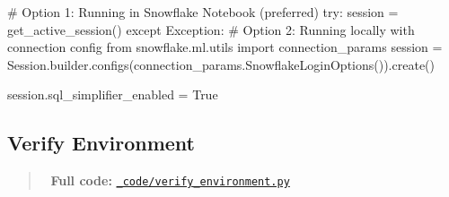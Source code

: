 \documentclass[
  letterpaper,
  DIV=11,
  numbers=noendperiod]{scrreprt}
\newenvironment{Shaded}{\begin{snugshade}}{\end{snugshade}}
\newcommand{\CommentTok}[1]{\textcolor[rgb]{0.37,0.37,0.37}{#1}}
\newcommand{\ControlFlowTok}[1]{\textcolor[rgb]{0.00,0.23,0.31}{#1}}
\newcommand{\ImportTok}[1]{\textcolor[rgb]{0.00,0.46,0.62}{#1}}
\newcommand{\NormalTok}[1]{\textcolor[rgb]{0.00,0.23,0.31}{#1}}
\newcommand{\OperatorTok}[1]{\textcolor[rgb]{0.37,0.37,0.37}{#1}}
\newcommand{\PreprocessorTok}[1]{\textcolor[rgb]{0.68,0.00,0.00}{#1}}
\newcommand{\VariableTok}[1]{\textcolor[rgb]{0.07,0.07,0.07}{#1}}
\begin{document}
\begin{Shaded}
\begin{Highlighting}[]
\CommentTok{\# Option 1: Running in Snowflake Notebook (preferred)}
\ControlFlowTok{try}\NormalTok{:}
\NormalTok{    session }\OperatorTok{=}\NormalTok{ get\_active\_session()}
\ControlFlowTok{except} \PreprocessorTok{Exception}\NormalTok{:}
    \CommentTok{\# Option 2: Running locally with connection config}
    \ImportTok{from}\NormalTok{ snowflake.ml.utils }\ImportTok{import}\NormalTok{ connection\_params}
\NormalTok{    session }\OperatorTok{=}\NormalTok{ Session.builder.configs(connection\_params.SnowflakeLoginOptions()).create()}

\NormalTok{session.sql\_simplifier\_enabled }\OperatorTok{=} \VariableTok{True}
\end{Highlighting}
\end{Shaded}

\hypertarget{verify-environment}{%
\subsection{Verify Environment}\label{verify-environment}}

\begin{quote}
📁 \textbf{Full code:}
\href{_code/verify_environment.py}{\texttt{\_code/verify\_environment.py}}
\end{quote}
\end{document}
